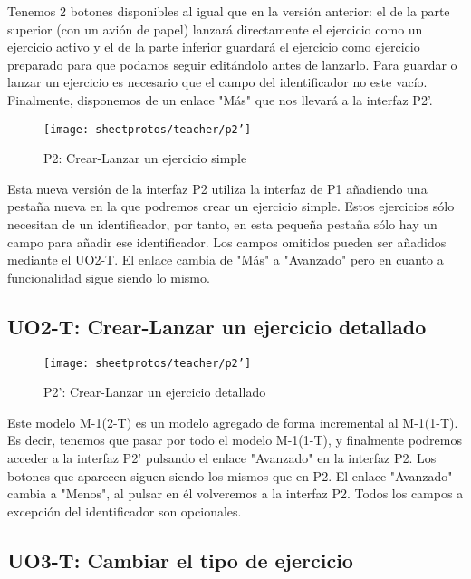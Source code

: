 Tenemos 2 botones disponibles al igual que en la versión anterior: el de la parte superior (con un avión de papel) lanzará directamente el ejercicio como un ejercicio activo y el de la parte inferior guardará el ejercicio como ejercicio preparado para que podamos seguir editándolo antes de lanzarlo. Para guardar o lanzar un ejercicio es necesario que el campo del identificador no este vacío. Finalmente, disponemos de un enlace "Más" que nos llevará a la interfaz P2'.\\

\begin{figure}[H]
	\centering
	\texttt{[image: sheetprotos/teacher/p2']}
	\caption{P2: Crear-Lanzar un ejercicio simple}
	\label{fig:p2}
\end{figure}

Esta nueva versión de la interfaz P2 utiliza la interfaz de P1 añadiendo una pestaña nueva en la que podremos crear un ejercicio simple. Estos ejercicios sólo necesitan de un identificador, por tanto, en esta pequeña pestaña sólo hay un campo para añadir ese identificador. Los campos omitidos pueden ser añadidos mediante el UO2-T. El enlace cambia de "Más" a "Avanzado" pero en cuanto a funcionalidad sigue siendo lo mismo.\\

\subsection{UO2-T: Crear-Lanzar un ejercicio detallado}
\label{analisis-de-requisitos:funcionales:uo2t}

\begin{figure}[H]
	\centering
	\texttt{[image: sheetprotos/teacher/p2']}
	\caption{P2': Crear-Lanzar un ejercicio detallado}
	\label{fig:p2'}
\end{figure}

Este modelo M-1(2-T) es un modelo agregado de forma incremental al M-1(1-T). Es decir, tenemos que pasar por todo el modelo M-1(1-T), y finalmente podremos acceder a la interfaz P2' pulsando el enlace "Avanzado" en la interfaz P2. Los botones que aparecen siguen siendo los mismos que en P2. El enlace "Avanzado" cambia a "Menos", al pulsar en él volveremos a la interfaz P2. Todos los campos a excepción del identificador son opcionales.\\

\subsection{UO3-T: Cambiar el tipo de ejercicio}
\label{analisis-de-requisitos:funcionales:uo3t}


